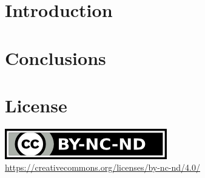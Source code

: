 \documentclass[sigconf, screen]{acmart}
\begin{document}
\maketitle
\section{Introduction}
\label{s:introduction}





\section{Conclusions}
\label{s:conclusions}




\section*{License}
\label{s:license}
\begin{center}
	\includegraphics{by-nc-nd.png} \\
	\url{https://creativecommons.org/licenses/by-nc-nd/4.0/}
\end{center}
\end{document}
